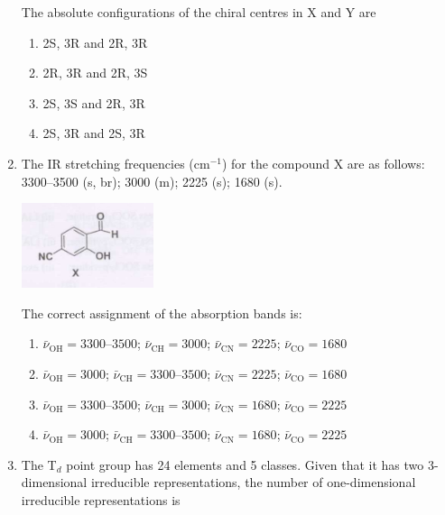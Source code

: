 \documentclass[12pt]{article}
\begin{document}
\begin{enumerate}
 The absolute configurations of the chiral centres in X and Y are

\begin{enumerate}
\item  2S, 3R  and  2R, 3R 
\item  2R, 3R  and  2R, 3S 
\item  2S, 3S  and  2R, 3R 
\item  2S, 3R  and  2S, 3R
\end{enumerate}    \hfill{}


\item The IR stretching frequencies (cm$^{-1}$) for the compound X are as follows: 3300--3500 (s, br); 3000 (m); 2225 (s); 1680 (s). 

\begin{center}
\includegraphics[width=0.6\columnwidth]{figs/q53.png}
\end{center}

The correct assignment of the absorption bands is:

\begin{enumerate}
\item  $\bar{\nu}_{\text{OH}} = 3300$--$3500$; $\bar{\nu}_{\text{CH}} = 3000$; $\bar{\nu}_{\text{CN}} = 2225$; $\bar{\nu}_{\text{CO}} = 1680$ 
\item  $\bar{\nu}_{\text{OH}} = 3000$; $\bar{\nu}_{\text{CH}} = 3300$--$3500$; $\bar{\nu}_{\text{CN}} = 2225$; $\bar{\nu}_{\text{CO}} = 1680$ 
\item  $\bar{\nu}_{\text{OH}} = 3300$--$3500$; $\bar{\nu}_{\text{CH}} = 3000$; $\bar{\nu}_{\text{CN}} = 1680$; $\bar{\nu}_{\text{CO}} = 2225$ 
\item  $\bar{\nu}_{\text{OH}} = 3000$; $\bar{\nu}_{\text{CH}} = 3300$--$3500$; $\bar{\nu}_{\text{CN}} = 1680$; $\bar{\nu}_{\text{CO}} = 2225$
\end{enumerate}    \hfill{}


\item The T$_d$ point group has 24 elements and 5 classes. Given that it has two 3-dimensional irreducible representations, the number of one-dimensional irreducible representations is
\begin{enumerate}
\end{enumerate}


\end{enumerate}
\end{document}
